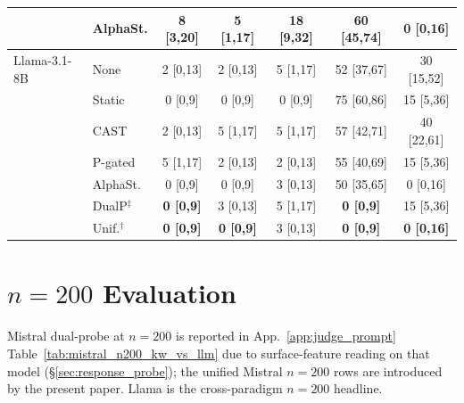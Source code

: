 \documentclass{article}
\begin{document}
\begin{longtable}{ll ccccc}
 & AlphaSt. & 8 [3,20] & 5 [1,17] & 18 [9,32] & 60 [45,74] & 0 [0,16] \\
\midrule
Llama-3.1-8B & None & 2 [0,13] & 2 [0,13] & 5 [1,17] & 52 [37,67] & 30 [15,52] \\
 & Static & 0 [0,9] & 0 [0,9] & 0 [0,9] & 75 [60,86] & 15 [5,36] \\
 & CAST & 2 [0,13] & 5 [1,17] & 5 [1,17] & 57 [42,71] & 40 [22,61] \\
 & P-gated & 5 [1,17] & 2 [0,13] & 2 [0,13] & 55 [40,69] & 15 [5,36] \\
 & AlphaSt. & 0 [0,9] & 0 [0,9] & 3 [0,13] & 50 [35,65] & 0 [0,16] \\
 & DualP$^{\ddagger}$ & \textbf{0 [0,9]} & 3 [0,13] & 5 [1,17] & \textbf{0 [0,9]} & 15 [5,36] \\
 & Unif.$^{\dagger}$ & \textbf{0 [0,9]} & \textbf{0 [0,9]} & 3 [0,13] & \textbf{0 [0,9]} & \textbf{0 [0,16]} \\
\bottomrule
\end{longtable}

\section{$n=200$ Evaluation}
\label{app:n200}

Mistral dual-probe at $n=200$ is reported in App.~\ref{app:judge_prompt} Table~\ref{tab:mistral_n200_kw_vs_llm} due to surface-feature reading on that model (\S\ref{sec:response_probe}); the unified Mistral $n=200$ rows are introduced by the present paper. Llama is the cross-paradigm $n=200$ headline.
\end{document}
